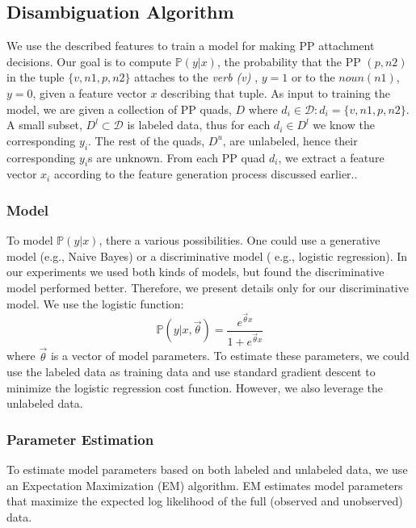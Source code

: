 \subsection{Disambiguation Algorithm}
We use the described features to train a  model for  making PP attachment decisions.
Our goal is to compute $\mathbb{P}(y|x)$,   the probability that the PP $ (p,n2)$ in the tuple $\{v,n1,p,n2\}$ attaches to the  \textit{verb (v)} , $y=1$ or  to the $noun (n1)$, $y=0$, given a feature vector $x$ describing that tuple.
As input to training the model, we are given a collection of PP quads, $D$ where  $d_i \in \mathcal{D}: d_i=\{v,n1,p,n2\} $. A small subset,
$D^l \subset \mathcal{D}$   is labeled data, thus for each $d_i \in D^l$ we know the corresponding $y_i$. The  rest of the quads, $D^u$,  are unlabeled, hence their corresponding $y_i$s are unknown.
From each PP quad $d_i$, we extract a feature vector $x_i$ according to the feature generation process  discussed earlier.. 

\subsubsection{Model}
To  model $\mathbb{P}(y|x)$, there a various possibilities. One could use a generative model (e.g., Naive Bayes) or a discriminative model ( e.g., logistic regression). In our experiments we used both kinds of models, but found the discriminative model performed better. Therefore, we present details only for our discriminative model.  We use the  logistic function: 
 \begin{equation*}
 \mathbb{P}(y|x, \vec \theta)  =  \frac{e^{\vec \theta x}}{1+ e^{\vec \theta x}}
\end{equation*}
 where $\vec \theta$  is a vector of model parameters. To estimate these parameters,  we could use the labeled data as training data and  use standard   gradient descent  to minimize the logistic regression cost function. However, we also leverage the unlabeled data.  

 
 \subsubsection{Parameter Estimation}
 To estimate model parameters based on both labeled and unlabeled data, we use an Expectation Maximization (EM) algorithm. 
 EM estimates model parameters that maximize the expected log likelihood of the full (observed and unobserved) data.  

